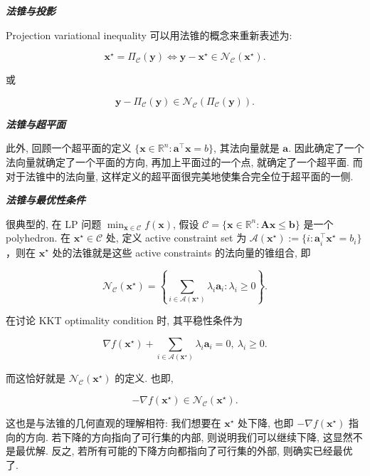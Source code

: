 \emph{\textbf{法锥与投影}}


\begin{propositionblock}[{法锥与投影}]
Projection variational inequality 可以用法锥的概念来重新表述为:

\[
\bm{x}^\star = \Pi_{\mathcal{C}}(\bm{y}) \iff \bm{y}-\bm{x}^\star \in \mathcal{N}_{\mathcal{C}}(\bm{x}^\star).
\]

或

\[
\bm{y} - \Pi_{\mathcal{C}}(\bm{y}) \in \mathcal{N}_{\mathcal{C}}(\Pi_{\mathcal{C}}(\bm{y})).
\]

\end{propositionblock}

\emph{\textbf{法锥与超平面}}

此外, 回顾一个超平面的定义 $\{\bm{x} \in \mathbb{R}^n: \bm{a}^\top \bm{x} = b\}$, 其法向量就是 $\bm{a}$. 因此确定了一个法向量就确定了一个平面的方向, 再加上平面过的一个点, 就确定了一个超平面. 而对于法锥中的法向量, 这样定义的超平面很完美地使集合完全位于超平面的一侧.

\emph{\textbf{法锥与最优性条件}}


\begin{propositionblock}
很典型的, 在 LP 问题 $\min_{\bm{x} \in \mathcal{C}} f(\bm{x})$, 假设 $\mathcal{C} = \{\bm{x} \in \mathbb{R}^n: \bm{A}\bm{x} \leq \bm{b}\}$ 是一个 polyhedron. 在 $\bm{x}^\star \in \mathcal{C}$ 处, 定义 active constraint set 为 $\mathcal{A}(\bm{x}^\star) := \{i: \bm{a}_i^\top \bm{x}^\star = b_i\}$，则在 $\bm{x}^\star$ 处的法锥就是这些 active constraints 的法向量的锥组合, 即

\[
\mathcal{N}_{\mathcal{C}}(\bm{x}^\star) = \left\{\sum_{i \in \mathcal{A}(\bm{x}^\star)} \lambda_i \bm{a}_i: \lambda_i \geq 0\right\}.
\]

\end{propositionblock}

在讨论 KKT optimality condition 时, 其平稳性条件为

\[
\nabla f(\bm{x}^\star) + \sum_{i \in \mathcal{A}(\bm{x}^\star)} \lambda_i \bm{a}_i = 0,~ \lambda_i \geq 0.
\]

而这恰好就是 $\mathcal{N}_{\mathcal{C}}(\bm{x}^\star)$ 的定义. 也即,

\[
- \nabla f(\bm{x}^\star) \in \mathcal{N}_{\mathcal{C}}(\bm{x}^\star).
\]

这也是与法锥的几何直观的理解相符: 我们想要在 $\bm{x}^\star$ 处下降, 也即 $-\nabla f(\bm{x}^\star)$ 指向的方向. 若下降的方向指向了可行集的内部, 则说明我们可以继续下降, 这显然不是最优解. 反之, 若所有可能的下降方向都指向了可行集的外部, 则确实已经最优了.

